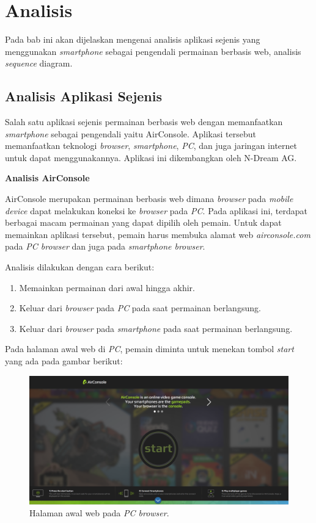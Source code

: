 \chapter{Analisis}
\label{chap:analisis}

Pada bab ini akan dijelaskan mengenai analisis aplikasi sejenis yang menggunakan \textit{smartphone} sebagai pengendali permainan berbasis web, analisis \textit{sequence} diagram.

\section{Analisis Aplikasi Sejenis}
\label{sec:AirConsole}

Salah satu aplikasi sejenis permainan berbasis web dengan memanfaatkan \textit{smartphone} sebagai pengendali yaitu AirConsole. Aplikasi tersebut memanfaatkan teknologi \textit{browser}, \textit{smartphone}, \textit{PC}, dan juga jaringan internet untuk dapat menggunakannya. Aplikasi ini dikembangkan oleh N-Dream AG.

\textbf{Analisis AirConsole} 

AirConsole merupakan permainan berbasis web dimana \textit{browser} pada \textit{mobile device} dapat melakukan koneksi ke \textit{browser} pada  \textit{PC}. Pada aplikasi ini, terdapat berbagai macam permainan yang dapat dipilih oleh pemain. Untuk dapat memainkan aplikasi tersebut, pemain harus membuka alamat web \textit{airconsole.com} pada \textit{PC browser} dan juga pada \textit{smartphone browser}.

Analisis dilakukan dengan cara berikut:
\begin{enumerate}
	\item Memainkan permainan dari awal hingga akhir.
	\item Keluar dari \textit{browser} pada \textit{PC} pada saat permainan berlangsung.
	\item Keluar dari \textit{browser} pada \textit{smartphone} pada saat permainan berlangsung.
\end{enumerate}
Pada halaman awal web di \textit{PC}, pemain diminta untuk menekan tombol \textit{start} yang ada pada gambar berikut: 

\begin{figure}[H]
	\centering
	\includegraphics[scale=0.3]{Gambar/con1_home1}
	\caption{Halaman awal web pada \textit{PC browser}.}
	\label{fig:16_con1_home1}
\end{figure}

